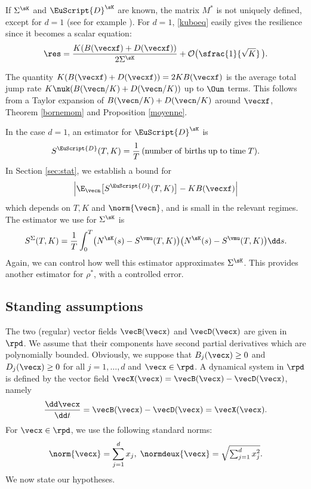 If $\Sigma^{\sK}$ and $\EuScript{D}^{\sK}$ are known, the matrix $M^*$ is not uniquely defined, except
for $d=1$ (see for example \cite{sim}).
For $d=1$, \eqref{kuboeq} easily gives the resilience since it becomes a scalar equation:
\[
\res = \frac{K(B(\vecxf)+D(\vecxf))}{2 \Sigma^{\sK}} +\mathcal{O}\bigl(\sfrac{1}{\sqrt{K}}\,\bigr).
\]
\begin{remark}
The quantity $K(B(\vecxf)+D(\vecxf)) = 2K B(\vecxf)$ is the average total jump rate $K \nuk(B(\vecn/K) +D(\vecn/K))$ up to $\Oun$ terms.
This follows from a Taylor expansion of $B(\vecn/K) +D(\vecn/K)$ around $\vecxf$, Theorem \ref{bornemom} and Proposition \ref{moyenne}.
\end{remark}
In the case $d=1$, an estimator for $\EuScript{D}^{\sK}$ is
\begin{equation}
\label{stat-D}
S^{{\EuScript{D}}}(T,K)=\frac{1}{T}\,(\mathrm{number\; of \; births\;up\; to\; time}\;T).
\end{equation}
In Section \ref{sec:stat}, we establish a bound for
\[
\left|\E_{\vecn}\bigl[S^{{\EuScript{D}}}(T,K)\bigr]- K B(\vecxf)\right|
\]
which depends on $T, K$ and $\norm{\vecn}$, and is small in the relevant regimes.
The estimator we use for $\Sigma^{\sK}$ is
\begin{equation}
\label{stat-MSigma}
S^{\Sigma}(T,K)=
\frac{1}{T}\int_{0}^{T}\bigl(N^{\sK}(s)-S^{\vmu}(T,K)\bigr)\bigl(N^{\sK}(s)-S^{\vmu}(T,K)\bigr)\dd s.
\end{equation}
Again, we can control how well this estimator approximates $\Sigma^{\sK}$. This provides another estimator for $\rho^*$, with a controlled error.

\subsection{Standing assumptions}\label{hypo}

The two (regular) vector fields $\vecB(\vecx)$ and $\vecD(\vecx)$ are given in $\rpd$.
We assume that their components have second partial derivatives which are polynomially bounded.
Obviously, we suppose that $B_j(\vecx)\geq 0$ and $D_j(\vecx)\geq 0$ for all $j=1,\ldots,d$ and $\vecx\in\rpd$.
A dynamical system in $\rpd$ is defined by the vector field $\vecX(\vecx)=\vecB(\vecx)-\vecD(\vecx)$, namely
\[
\frac{\dd \vecx}{\dd t}=\vecB(\vecx)-\vecD(\vecx)=\vecX(\vecx).
\]
For $\vecx\in \rpd$, we use the following standard norms:
\[
\norm{\vecx}=\sum_{j=1}^{d}x_{j}, \;
\normdeux{\vecx}=\sqrt{\textstyle\sum_{j=1}^{d} x_{j}^2}.
\]
We now state our hypotheses.


